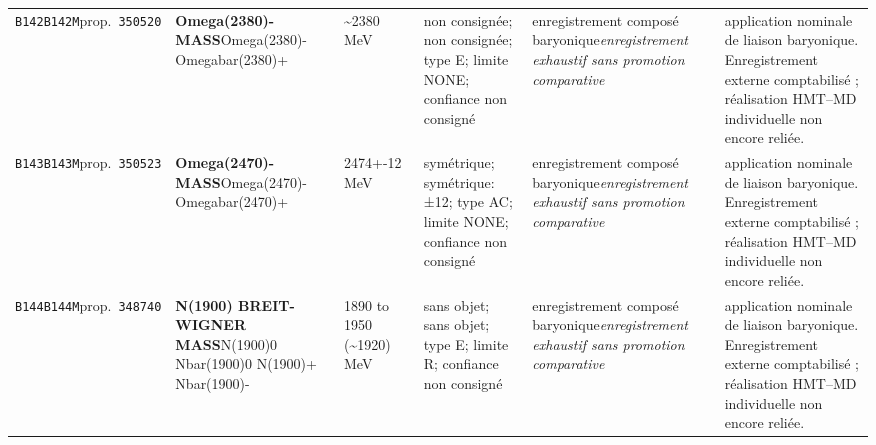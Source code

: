 \begin{landscape}
\begin{longtable}{L{1.85cm}L{4.45cm}L{2.35cm}L{4.05cm}L{3.35cm}L{7.15cm}}
\texttt{B142}\newline \texttt{B142M}\newline prop.\ \texttt{350520} & \textbf{Omega(2380)- MASS}\newline Omega(2380)- \textbar{}\allowbreak{} Omegabar(2380)+ & \textasciitilde{}2380\,MeV & non consignée; non consignée; type E; limite NONE; confiance non consigné & enregistrement composé baryonique\newline \emph{enregistrement exhaustif sans promotion comparative} & application nominale de liaison baryonique. Enregistrement externe comptabilisé ; réalisation HMT--MD individuelle non encore reliée. \\
\texttt{B143}\newline \texttt{B143M}\newline prop.\ \texttt{350523} & \textbf{Omega(2470)- MASS}\newline Omega(2470)- \textbar{}\allowbreak{} Omegabar(2470)+ & 2474+-12\,MeV & symétrique; symétrique: ±12; type AC; limite NONE; confiance non consigné & enregistrement composé baryonique\newline \emph{enregistrement exhaustif sans promotion comparative} & application nominale de liaison baryonique. Enregistrement externe comptabilisé ; réalisation HMT--MD individuelle non encore reliée. \\
\texttt{B144}\newline \texttt{B144M}\newline prop.\ \texttt{348740} & \textbf{N(1900) BREIT-WIGNER MASS}\newline N(1900)0 \textbar{}\allowbreak{} Nbar(1900)0 \textbar{}\allowbreak{} N(1900)+ \textbar{}\allowbreak{} Nbar(1900)- & 1890 to 1950 (\textasciitilde{}1920)\,MeV & sans objet; sans objet; type E; limite R; confiance non consigné & enregistrement composé baryonique\newline \emph{enregistrement exhaustif sans promotion comparative} & application nominale de liaison baryonique. Enregistrement externe comptabilisé ; réalisation HMT--MD individuelle non encore reliée. \\

\end{longtable}
\end{landscape}
